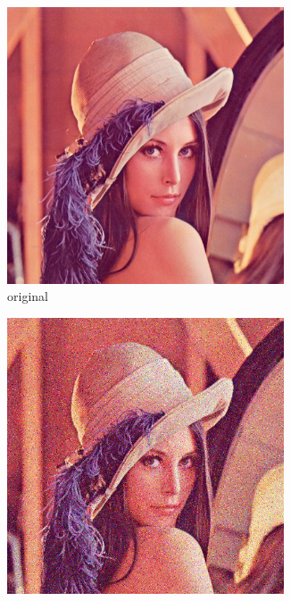 \documentclass[12pt]{article}
\begin{document}
\begin{figure}[H]\centering
    \begin{subfigure}[t]{0.25\textwidth}\centering
        \includegraphics[width=0.9\textwidth]{lenac.png}
        \caption{original}
    \end{subfigure}
    \begin{subfigure}[t]{0.25\textwidth}\centering
        \includegraphics[width=0.9\textwidth]{lenac_normal3.png}

\end{subfigure}
\end{figure}
\end{document}
